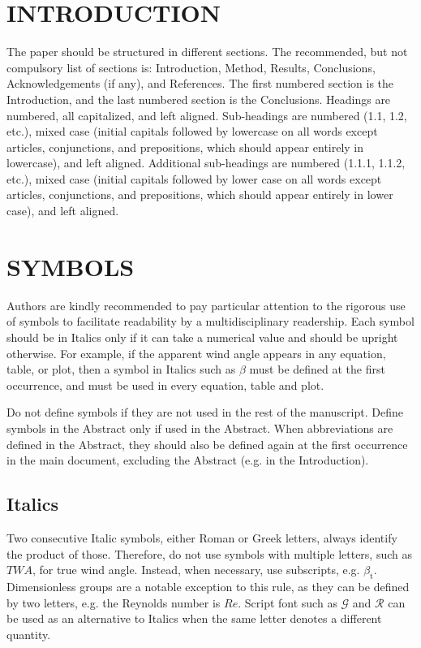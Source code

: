 \documentclass{article}
\begin{document}
\section{INTRODUCTION} \label{sec:intro}
The paper should be structured in different sections. The recommended, but not compulsory list of sections is: Introduction, Method, Results, Conclusions, Acknowledgements (if any), and References. 
The first numbered section is the Introduction, and the last numbered section is the Conclusions. Headings are numbered, all capitalized, and left aligned. Sub-headings are numbered (1.1, 1.2, etc.), mixed case (initial capitals followed by lowercase on all words except articles, conjunctions, and prepositions, which should appear entirely in lowercase), and left aligned. Additional sub-headings are numbered (1.1.1, 1.1.2, etc.), mixed case (initial capitals followed by lower case on all words except articles, conjunctions, and prepositions, which should appear entirely in lower case), and left aligned.

\section{SYMBOLS} \label{sec:symbols}

Authors are kindly recommended to pay particular attention to the rigorous use of symbols to facilitate readability by a multidisciplinary readership. Each symbol should be in Italics only if it can take a numerical value and should be upright otherwise. For example, if the apparent wind angle appears in any equation, table, or plot, then a symbol in Italics such as $\beta$ must be defined at the first occurrence, and must be used in every equation, table and plot.  

Do not define symbols if they are not used in the rest of the manuscript. Define symbols in the Abstract only if used in the Abstract. When abbreviations are defined in the Abstract, they should also be defined again at the first occurrence in the main document, excluding the Abstract (e.g. in the Introduction). 

\subsection{Italics}

Two consecutive Italic symbols, either Roman or Greek letters, always identify the product of those. Therefore, do not use symbols with multiple letters, such as $TWA$, for true wind angle. Instead, when necessary, use subscripts, e.g. $\beta_\text{t}$. Dimensionless groups are a notable exception to this rule, as they can be defined by two letters, e.g. the Reynolds number is $Re$. Script font such as $\mathcal{G}$ and $\mathcal{R}$ can be used as an alternative to Italics when the same letter denotes a different quantity.
\end{document}
